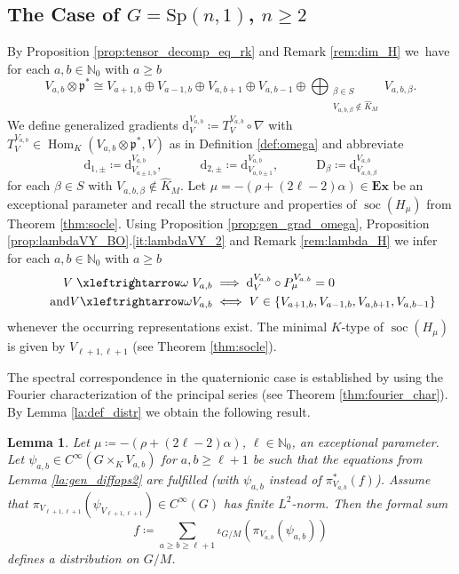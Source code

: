 \documentclass[JEP,XML,SOM,NoFloatCountersInSection,Unicode,published]{cedram}
\newtheorem{lemma}[theorem]{Lemma}
\theoremstyle{definition}
\newcommand{\lraomega}{\ensuremath{\xleftrightarrow\omega}}
\newcommand{\notleftrightomega}{\mathrel{\ooalign{$\xleftrightarrow\omega$\cr\hidewidth$/$\hidewidth}}}
\newcommand{\mf}[1]{\ensuremath{\mathfrak{#1}}}
\newcommand{\on}[1]{\ensuremath{\operatorname{#1}}}
\newcommand{\Hom}[3]{\ensuremath{\on{Hom}_{#1}(#2,#3)}}
\newcommand{\rhoa}{\ensuremath{\rho}}
\newcommand{\N}{\ensuremath{\mathbb{N}}}
\newcommand{\pst}[1]{\ensuremath{H_{#1}}}
\newcommand{\GSp}[1]{\ensuremath{\mathrm{Sp}(#1,1)}}
\begin{document}
\subsection{\texorpdfstring{The Case of $G=\GSp{n}$, $n\geq 2$}{The Case of G=Sp(n,1), n>=2}}

By Proposition \ref{prop:tensor_decomp_eq_rk} and Remark \ref{rem:dim_H} we~have for each $a,b\in\N_0$ with $a\geq b$
\[
V_{a,b}\otimes\mf p^*\cong V_{a+1,b}\oplus V_{a-1,b}\oplus V_{a,b+1}\oplus V_{a,b-1}\oplus\bigoplus_{\substack{\beta\in S\\V_{a,b,\beta}\not\in\hat K_M}} V_{a,b,\beta}.
\]
We define generalized gradients $\mathrm{d}_V^{V_{a,b}}\coloneqq T_V^{V_{a,b}}\circ\nabla$ with $T_V^{V_{a,b}}\in\Hom{K}{V_{a,b}\otimes\mf p^*}{V}$ as in Definition \ref{def:omega} and abbreviate
\[
\mathrm{d}_{1,\pm}\coloneqq\mathrm{d}_{V_{a\pm1,b}}^{V_{a,b}},\qquad\quad\mathrm{d}_{2,\pm}\coloneqq\mathrm{d}_{V_{a,b\pm1}}^{V_{a,b}},\qquad\quad\mathrm{D}_\beta\coloneqq\mathrm{d}_{V_{a,b,\beta}}^{V_{a,b}}
\]
for each $\beta\in S$ with $V_{a,b,\beta}\not\in\hat K_M$. Let $\mu=-(\rhoa+(2\ell-2)\alpha)\in\mathbf{Ex}$ be an exceptional parameter and recall the structure and properties of $\on{soc}(\pst{\mu})$ from Theorem \ref{thm:socle}. Using Proposition \ref{prop:gen_grad_omega}, Proposition \ref{prop:lambdaVY_BO}.\ref{it:lambdaVY_2} and Remark \ref{rem:lambda_H} we infer for each $a,b\in\N_0$ with $a\geq b$
\begin{align*}
V\notleftrightomega V_{a,b}&\implies\mathrm{d}_V^{V_{a,b}}\circ P_\mu^{V_{a,b}}=0\\
\tag*{and} V\lraomega V_{a,b}&\iff V\in\{V_{a+1,b}, V_{a-1,b}, V_{a,b+1}, V_{a,b-1}\}
\end{align*}
whenever the occurring representations exist. The minimal $K$-type of $\on{soc}(\pst{\mu})$ is given by $V_{\ell+1,\ell+1}$ (see Theorem \ref{thm:socle}).

The spectral correspondence in the quaternionic case is established by using the Fourier characterization of the principal series (see Theorem \ref{thm:fourier_char}). By Lemma \ref{la:def_distr} we obtain the following result.
\begin{lemma}\label{la:poly_growth_Spn}
Let $\mu\coloneqq-(\rhoa+(2\ell-2)\alpha)$, $\ell\in\N_0$, an exceptional parameter. Let $\psi_{a,b}\in C^\infty(G\times_KV_{a,b})$ for $a,b\geq\ell+1$ be such that the equations from Lemma \ref{la:gen_diffops2} are fulfilled (with $\psi_{a,b}$ instead of $\pi_{V_{a,b}}^*(f)$). Assume that $\pi_{V_{\ell+1,\ell+1}}(\psi_{V_{\ell+1,\ell+1}})\in C^\infty(G)$ has finite $L^2$-norm.
Then the formal sum
\[
f\coloneqq\sum_{a\geq b\geq\ell+1}\iota_{G/M}(\pi_{V_{a,b}}(\psi_{a,b}))
\]
defines a distribution on $G/M$.
\end{lemma}
\end{document}
